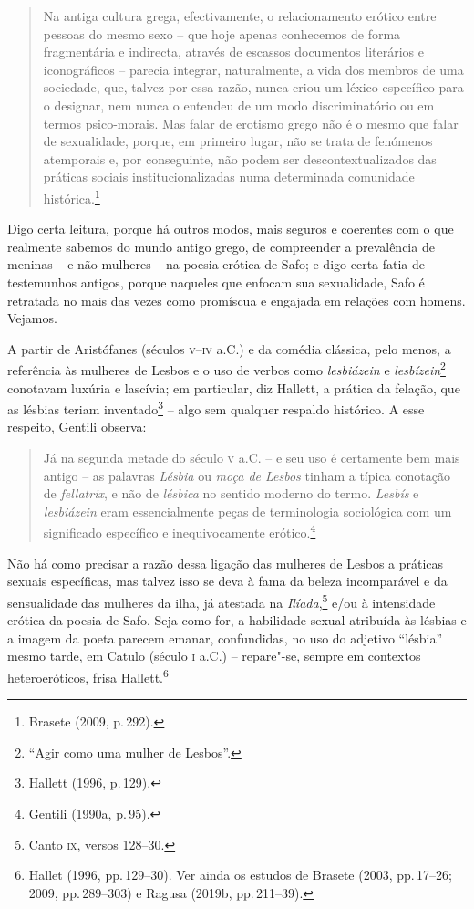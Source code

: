 \begin{quote}
Na antiga cultura grega, efectivamente, o relacionamento erótico entre pessoas do mesmo sexo – que hoje apenas conhecemos de forma fragmentária e indirecta, através de escassos documentos literários e iconográficos – parecia integrar, naturalmente, a vida dos membros de uma sociedade, que, talvez por essa razão, nunca criou um léxico específico para o designar, nem nunca o entendeu de um modo discriminatório ou em termos psico-morais. Mas falar de erotismo grego não é o mesmo que falar de sexualidade, porque, em primeiro lugar, não se trata de fenómenos atemporais e, por conseguinte, não podem ser descontextualizados das práticas sociais institucionalizadas numa determinada comunidade histórica.\footnote{Brasete (2009, p.\,292).}
\end{quote}


\noindent{}Digo certa leitura, porque há outros modos, mais
seguros e coerentes com o que realmente sabemos do mundo antigo grego, de
compreender a prevalência de meninas -- e não mulheres --  na poesia erótica de Safo; e digo
certa fatia de testemunhos antigos, porque naqueles que enfocam sua
sexualidade, Safo é retratada no mais das vezes como promíscua e engajada em relações com homens. Vejamos. 

A partir de Aristófanes (séculos \textsc{v}--\textsc{iv} a.C.) e da comédia clássica, pelo menos, a
referência às mulheres de Lesbos e o uso de verbos como \textit{lesbiázein} e
\textit{lesbízein}\footnote{``Agir como uma mulher de Lesbos''.} conotavam luxúria e
lascívia; em particular, diz Hallett, a prática da
felação, que as lésbias teriam inventado\footnote{ Hallett (1996, p.\,129).} -- algo sem qualquer respaldo
histórico. A esse respeito, Gentili observa: 

\begin{quote}
Já na segunda metade do século \textsc{v} a.C. -- e seu uso é certamente bem mais antigo
-- as palavras \textit{Lésbia} ou \textit{moça de Lesbos} tinham a típica
conotação de \textit{fellatrix}, e não de \textit{lésbica} no sentido moderno
do termo. \textit{Lesbís} e \textit{lesbiázein} eram essencialmente peças de
terminologia sociológica com um significado específico e inequivocamente
erótico.\footnote{ Gentili (1990a, p.\,95).}
\end{quote}

Não há como precisar a razão dessa ligação das mulheres de Lesbos a práticas
sexuais específicas, mas talvez isso se deva à fama da beleza incomparável e da
sensualidade das mulheres da ilha, já atestada na \textit{Ilíada},\footnote{Canto \textsc{ix}, versos 128--30.}
e/ou à intensidade erótica da poesia de Safo. Seja como for, a habilidade
sexual atribuída às lésbias e a imagem da poeta parecem
emanar, confundidas, no uso do adjetivo “lésbia” mesmo tarde, em Catulo
(século \textsc{i} a.C.) -- repare"-se, sempre em contextos heteroeróticos, frisa Hallett.\footnote{ Hallet 
(1996, pp.\,129--30). Ver ainda os estudos de Brasete (2003, pp.\,17--26; 2009, pp.\,289--303) e Ragusa (2019b, pp.\,211--39).} 

